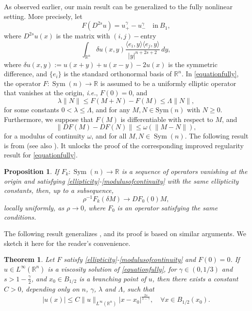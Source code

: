 \documentclass[11pt,reqno]{amsart}
\newtheorem{theorem}{Theorem}
\newtheorem{proposition}{Proposition}
\numberwithin{equation}{section}
\numberwithin{theorem}{section}
\numberwithin{lemma}{section}
\numberwithin{corollary}{section}
\numberwithin{remark}{section}
\numberwithin{proposition}{section}
\numberwithin{definition}{section}
\newcommand{\R}{\mathbb{R}}
\begin{document}
As observed earlier, our main result can be generalized to the fully nonlinear setting. More precisely, let 
\begin{equation}\label{equationfully}
F(D^{2s}u)=u_+^\gamma-u_-^\gamma\quad \textrm{in}\ B_1,
\end{equation}
where $D^{2s}u(x)$ is the matrix with $(i,j)-$entry
$$
\int_{\R^n}\delta u(x,y)\frac{\langle e_i,y\rangle \langle e_j,y\rangle}{|y|^{n+2s+2}}\,dy,
$$
where $\delta u(x,y):=u(x+y)+u(x-y)-2u(x)$ is the symmetric difference, and $\{e_i\}$ is the standard orthonormal basis of $\R^n$. In \eqref{equationfully}, the operator $F:\operatorname{Sym}(n)\rightarrow \R$ is assumed to be a uniformly elliptic operator that vanishes at the origin, \textit{i.e.}, $F(0)=0$, and 
\begin{equation}\label{ellipticity}
    \lambda\|N\|\leq F(M+N)-F(M)\leq\Lambda\|N\|,
\end{equation}
for some constants $0<\lambda\le\Lambda$, and for any $M,N\in \text{Sym}(n)$ with $N\geq 0$. Furthermore, we suppose that $F(M)$ is differentiable with respect to $M$, and     \begin{equation}\label{modulusofcontinuity}
    \|DF(M)-DF(N)\|\leq\omega(\|M-N\|),
\end{equation}
for a modulus of continuity $\omega$, and for all $M,N\in \operatorname{Sym}(n)$.
The following result is from \cite[Proposition 2.2]{HY} (see also \cite{ASS, PT}). It unlocks the proof of the corresponding improved regularity result for \eqref{equationfully}.

\begin{proposition}\label{convergence}
    If $F_k:\operatorname{Sym}(n)\to\R$ is a sequence of operators vanishing at the origin and satisfying \eqref{ellipticity}-\eqref{modulusofcontinuity} with the same ellipticity constants, then, up to a subsequence,
    $$
    \rho^{-1}F_k(\delta M) \longrightarrow DF_0(0)M,
    $$
    locally uniformly, as $\rho\to0$, where $F_0$ is an operator satisfying the same conditions.
\end{proposition}

The following result generalizes , and its proof is based on similar arguments. We sketch it here for the reader's convenience.

\begin{theorem}
    Let $F$ satisfy \eqref{ellipticity}-\eqref{modulusofcontinuity} and $F(0)=0$. If $u\in L^\infty(\R^n)$ is a viscosity solution of \eqref{equationfully}, for $\gamma\in(0,1/3)$ and $s>1-\frac{\gamma}{2}$, and $x_0\in B_{1/2}$ is a branching point of $u$, then there exists a constant $C>0$, depending only on $n$, $\gamma$, $\lambda$ and $\Lambda$, such that
    $$
    |u(x)|\le C\|u\|_{L^\infty(\R^n)}|x-x_0|^{\frac{2s}{1-\gamma}}, \quad \forall x \in B_{1/2}(x_0). 
    $$    
\end{theorem}
\end{document}

